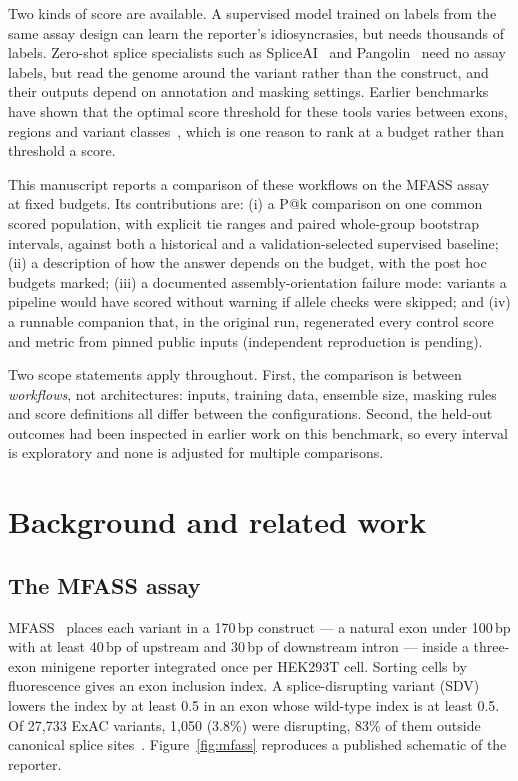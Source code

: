 \documentclass[11pt]{article}
\makeatletter
\newcommand{\pk}[1]{P@#1}
\makeatother
\begin{document}
Two kinds of score are available. A supervised model trained on labels from the same assay design can learn
the reporter's idiosyncrasies, but needs thousands of labels. Zero-shot splice specialists such as
SpliceAI~\citep{jaganathan2019spliceai} and Pangolin~\citep{zeng2022pangolin} need no assay labels, but read
the genome around the variant rather than the construct, and their outputs depend on annotation and masking
settings. Earlier benchmarks have shown that the optimal score threshold for these tools varies between
exons, regions and variant classes~\citep{smith2023benchmarking}, which is one reason to rank at a budget
rather than threshold a score.

This manuscript reports a comparison of these workflows on the MFASS assay~\citep{chong2019mfass} at fixed
budgets. Its contributions are:
(i) a \pk{k} comparison on one common scored population, with explicit tie ranges and paired whole-group
bootstrap intervals, against both a historical and a validation-selected supervised baseline;
(ii) a description of how the answer depends on the budget, with the post hoc budgets marked;
(iii) a documented assembly-orientation failure mode: variants a pipeline would have scored without warning if
allele checks were skipped;
and (iv) a runnable companion that, in the original run, regenerated every control score and metric from pinned public
inputs (independent reproduction is pending).

Two scope statements apply throughout. First, the comparison is between \emph{workflows}, not architectures:
inputs, training data, ensemble size, masking rules and score definitions all differ between the
configurations. Second, the held-out outcomes had been inspected in earlier work on this benchmark, so every
interval is exploratory and none is adjusted for multiple comparisons.

\section{Background and related work}\label{sec:background}

\subsection{The MFASS assay}
MFASS~\citep{chong2019mfass} places each variant in a 170\,bp construct --- a natural exon under 100\,bp with
at least 40\,bp of upstream and 30\,bp of downstream intron --- inside a three-exon minigene reporter integrated
once per HEK293T cell. Sorting cells by fluorescence gives an exon inclusion index. A splice-disrupting variant
(SDV) lowers the index by at least 0.5 in an exon whose wild-type index is at least 0.5. Of 27,733 ExAC
variants, 1,050 (3.8\%) were disrupting, 83\% of them outside canonical splice sites~\citep{chong2019mfass}.
Figure~\ref{fig:mfass} reproduces a published schematic of the reporter.
\end{document}
